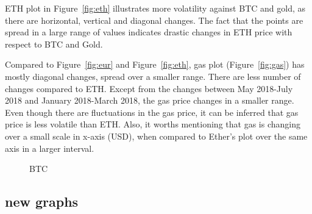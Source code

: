 ETH plot in Figure~\ref{fig:eth} illustrates more volatility against BTC and gold, as there are horizontal, vertical and diagonal changes. The fact that the points are spread in a large range of values indicates drastic changes in ETH price with respect to BTC and Gold.

Compared to Figure~\ref{fig:eur} and Figure~\ref{fig:eth}, gas plot (Figure~\ref{fig:gas}) has mostly diagonal changes, spread over a smaller range. There are less number of changes compared to ETH. Except from the changes between May 2018-July 2018 and January 2018-March 2018, the gas price changes in a smaller range. Even though there are fluctuations in the gas price, it can be inferred that gas price is less volatile than ETH. Also, it worths mentioning that gas is changing over a small scale in x-axis (USD), when compared to Ether's plot over the same axis in a larger interval.



\begin{figure}[!htb]
	\centering
	\hfill
	\caption{BTC}
	\label{fig:Comparison}
\end{figure}

\subsection{new graphs}


